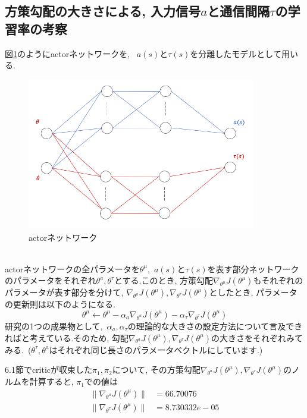 \documentclass{jsarticle}
\begin{document}
{\subsection{方策勾配の大きさによる, 入力信号$a$と通信間隔$\tau$の学習率の考察}
図\ref{split_NN}のようにactorネットワークを, ~$a(s)$と$\tau(s)$を分離したモデルとして用いる. 
\begin{figure}[h]
	\centering
 	\includegraphics[width=10cm]{split_NN.png}
 	\caption{actorネットワーク} \label{split_NN}
\end{figure}\\
actorネットワークの全パラメータを$\theta^{\mu}$,~$a(s)$と$\tau(s)$を表す部分ネットワークのパラメータをそれぞれ$\theta^a, \theta^{\tau}$とする.このとき, 方策勾配$\nabla_{\theta^{\mu}}J(\theta^{\mu})$もそれぞれのパラメータが表す部分を分けて, $\nabla_{\theta^a}J(\theta^{\mu}), \nabla_{\theta^{\tau}}J(\theta^{\mu})$としたとき, パラメータの更新則は以下のようになる.
\begin{equation}
	\theta^{\mu}\gets \theta^{\mu} - \alpha_a\nabla_{\theta^a}J(\theta^{\mu}) - \alpha_{\tau}\nabla_{\theta^{\tau}}J(\theta^{\mu})
\end{equation}
研究の1つの成果物として,~$\alpha_a, \alpha_{\tau}$の理論的な大きさの設定方法について言及できればと考えている.そのため, 勾配$\nabla_{\theta^a}J(\theta^{\mu}), \nabla_{\theta^{\tau}}J(\theta^{\mu})$の大きさをそれぞれみてみる.~($\theta^{\tau}, \theta^{a}$はそれぞれ同じ長さのパラメータベクトルにしています.)\par
6.1節でcriticが収束した$\pi_1, \pi_2$について, その方策勾配$\nabla_{\theta^a}J(\theta^{\mu}), \nabla_{\theta^{\tau}}J(\theta^{\mu})$のノルムを計算すると, $\pi_1$での値は
\begin{align}
	\|\nabla_{\theta^a}J(\theta^{\mu})\| &= 66.70076 \\
	\|\nabla_{\theta^{\tau}}J(\theta^{\mu})\| &= 8.730332e-05
\end{align}
}
\end{document}
